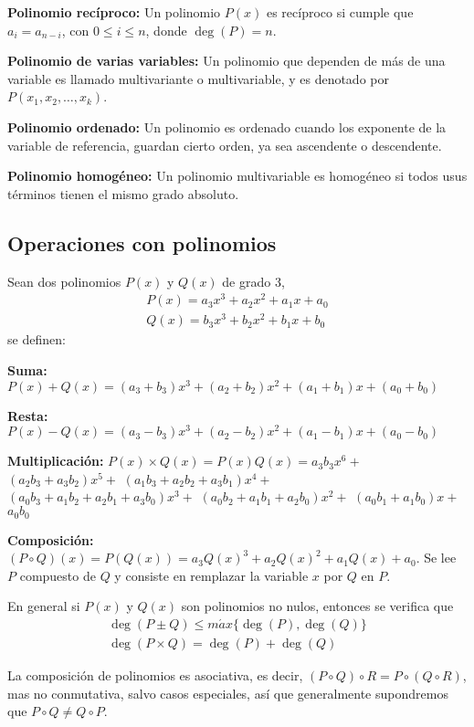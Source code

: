 \textbf{Polinomio recíproco:} Un polinomio $P(x)$ es recíproco si cumple que $a_i = a_{n-i}$, con $0\leq i\leq n$, donde $\deg{(P)} = n$.

\textbf{Polinomio de varias variables:} Un polinomio que dependen de más de una variable es llamado multivariante o multivariable, y es denotado por $P(x_1, x_2, \dots, x_k)$.

\textbf{Polinomio ordenado:} Un polinomio es ordenado cuando los exponente de la variable de referencia, guardan cierto orden, ya sea ascendente o descendente.

\textbf{Polinomio homogéneo:} Un polinomio multivariable es homogéneo si todos usus términos tienen el mismo grado absoluto.


\subsection{Operaciones con polinomios}

Sean dos polinomios $P(x)$ y $Q(x)$ de grado 3,
\begin{gather*}
    P(x) = a_3 x^3 + a_2 x^2 + a_1 x + a_0\\
    Q(x) = b_3 x^3 + b_2 x^2 + b_1 x + b_0
\end{gather*}
se definen:

\textbf{Suma:} $P(x) + Q(x) = (a_3+b_3)x^3+(a_2+b_2)x^2+(a_1+b_1)x+(a_0+b_0)$

\textbf{Resta:} $P(x) - Q(x) = (a_3-b_3)x^3+(a_2-b_2)x^2+(a_1-b_1)x+(a_0-b_0)$

\textbf{Multiplicación:} $P(x)\times Q(x) = P(x)Q(x) = a_3 b_3 x^6 + $
$(a_2 b_3 + a_3 b_2)x^5 + $
$(a_1 b_3 + a_2 b_2 + a_3 b_1)x^4 + $\\
$(a_0 b_3 + a_1 b_2 + a_2 b_1 + a_3 b_0)x^3 + $
$(a_0 b_2 + a_1 b_1 + a_2 b_0)x^2 + $
$(a_0 b_1 + a_1 b_0)x + $
$a_0 b_0$

\textbf{Composición:} $(P \circ Q)(x) = P(Q(x)) = a_3 Q(x)^3 + a_2 Q(x)^2 + a_1 Q(x) + a_0$. Se lee $P$ compuesto de $Q$ y consiste en remplazar la variable $x$ por $Q$ en $P$.

En general si $P(x)$ y $Q(x)$ son polinomios no nulos, entonces se verifica que
\begin{gather*}
    \deg{(P\pm Q)} \leq m\acute ax\{\deg{(P)}, \deg{(Q)}\}\\
    \deg{(P\times Q)} = \deg{(P)} + \deg{(Q)}
\end{gather*}


La composición de polinomios es asociativa, es decir, $(P \circ Q) \circ R = P \circ (Q \circ R)$, mas no conmutativa, salvo casos especiales, así que generalmente supondremos que $P \circ Q \neq  Q \circ P$.

